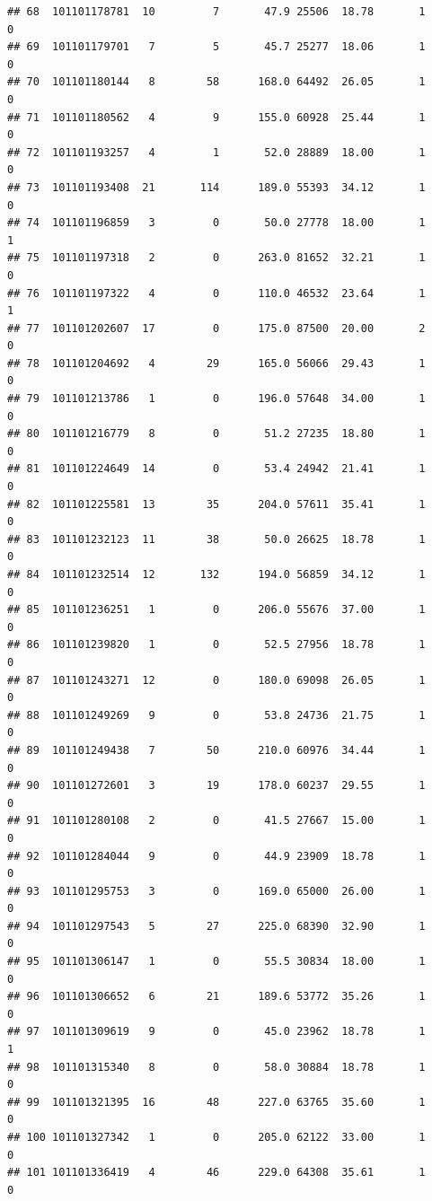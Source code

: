 \documentclass[
]{article}
\begin{document}
\begin{verbatim}
## 68  101101178781  10         7       47.9 25506  18.78       1          0
## 69  101101179701   7         5       45.7 25277  18.06       1          0
## 70  101101180144   8        58      168.0 64492  26.05       1          0
## 71  101101180562   4         9      155.0 60928  25.44       1          0
## 72  101101193257   4         1       52.0 28889  18.00       1          0
## 73  101101193408  21       114      189.0 55393  34.12       1          0
## 74  101101196859   3         0       50.0 27778  18.00       1          1
## 75  101101197318   2         0      263.0 81652  32.21       1          0
## 76  101101197322   4         0      110.0 46532  23.64       1          1
## 77  101101202607  17         0      175.0 87500  20.00       2          0
## 78  101101204692   4        29      165.0 56066  29.43       1          0
## 79  101101213786   1         0      196.0 57648  34.00       1          0
## 80  101101216779   8         0       51.2 27235  18.80       1          0
## 81  101101224649  14         0       53.4 24942  21.41       1          0
## 82  101101225581  13        35      204.0 57611  35.41       1          0
## 83  101101232123  11        38       50.0 26625  18.78       1          0
## 84  101101232514  12       132      194.0 56859  34.12       1          0
## 85  101101236251   1         0      206.0 55676  37.00       1          0
## 86  101101239820   1         0       52.5 27956  18.78       1          0
## 87  101101243271  12         0      180.0 69098  26.05       1          0
## 88  101101249269   9         0       53.8 24736  21.75       1          0
## 89  101101249438   7        50      210.0 60976  34.44       1          0
## 90  101101272601   3        19      178.0 60237  29.55       1          0
## 91  101101280108   2         0       41.5 27667  15.00       1          0
## 92  101101284044   9         0       44.9 23909  18.78       1          0
## 93  101101295753   3         0      169.0 65000  26.00       1          0
## 94  101101297543   5        27      225.0 68390  32.90       1          0
## 95  101101306147   1         0       55.5 30834  18.00       1          0
## 96  101101306652   6        21      189.6 53772  35.26       1          0
## 97  101101309619   9         0       45.0 23962  18.78       1          1
## 98  101101315340   8         0       58.0 30884  18.78       1          0
## 99  101101321395  16        48      227.0 63765  35.60       1          0
## 100 101101327342   1         0      205.0 62122  33.00       1          0
## 101 101101336419   4        46      229.0 64308  35.61       1          0

\end{verbatim}
\end{document}
